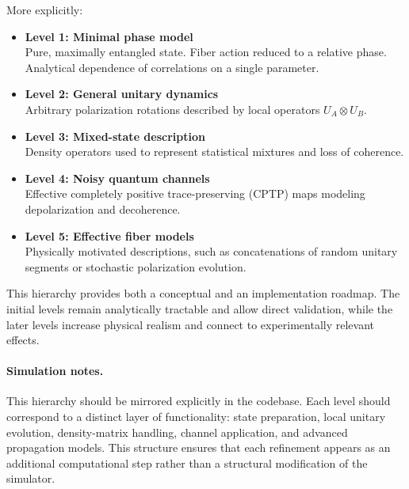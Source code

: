\documentclass[a4paper]{article}
\begin{document}
More explicitly:

\begin{itemize}
    \item \textbf{Level 1: Minimal phase model} \\
    Pure, maximally entangled state. Fiber action reduced to a relative phase. Analytical dependence of correlations on a single parameter.

    \item \textbf{Level 2: General unitary dynamics} \\
    Arbitrary polarization rotations described by local operators \(U_A \otimes U_B\).

    \item \textbf{Level 3: Mixed-state description} \\
    Density operators used to represent statistical mixtures and loss of coherence.

    \item \textbf{Level 4: Noisy quantum channels} \\
    Effective completely positive trace-preserving (CPTP) maps modeling depolarization and decoherence.

    \item \textbf{Level 5: Effective fiber models} \\
    Physically motivated descriptions, such as concatenations of random unitary segments or stochastic polarization evolution.
\end{itemize}

This hierarchy provides both a conceptual and an implementation roadmap. The initial levels remain analytically tractable and allow direct validation, while the later levels increase physical realism and connect to experimentally relevant effects.

\paragraph{Simulation notes.}
This hierarchy should be mirrored explicitly in the codebase. Each level should correspond to a distinct layer of functionality: state preparation, local unitary evolution, density-matrix handling, channel application, and advanced propagation models. This structure ensures that each refinement appears as an additional computational step rather than a structural modification of the simulator.

\end{document}
